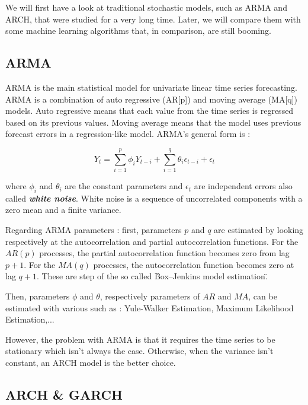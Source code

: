 \documentclass[11pt,a4paper,oneside]{book}
\begin{document}
We will first have a look at traditional stochastic models, such as ARMA and ARCH, that were studied for a very long time. Later, we will compare them with some machine learning algorithms that, in comparison, are still booming.


\subsection{ARMA}

ARMA is the main statistical model for univariate linear time series forecasting. ARMA is a combination of auto regressive (AR[p]) and moving average (MA[q]) models. Auto regressive means that each value from the time series is regressed based on its previous values. Moving average means that the model uses previous forecast errors in a regression-like model. ARMA's general form is : 

\begin{equation}
Y_{t} = \sum\limits_{i=1}^p \phi_{i} Y_{t-i} +  \sum\limits_{i=1}^q \theta_{i} \epsilon_{t-i} + \epsilon_{t} 
\end{equation}

where $\phi_{i}$ and $\theta_{i}$ are the constant parameters and $\epsilon_{t}$ are independent errors also called \textit{\textbf{white noise}}. White noise is a sequence of uncorrelated components with a zero mean and a finite variance.

Regarding ARMA parameters : first, parameters $p$ and $q$ are estimated by looking respectively at the autocorrelation and partial autocorrelation functions. For the $AR(p)$ processes, the partial autocorrelation function becomes zero from lag $p + 1$. For the $MA(q)$ processes, the autocorrelation function becomes zero at lag $q + 1$. These are step of the so called \"Box–Jenkins model estimation\". \cite{boxjenk}

Then, parameters $\phi$ and $\theta$, respectively parameters of $AR$ and $MA$, can be estimated with various such as : Yule-Walker Estimation, Maximum Likelihood Estimation,...

However, the problem with ARMA is that it requires the time series to be stationary which isn't always the case. Otherwise, when the variance isn't constant, an ARCH model is the better choice. \cite{Holan}


\subsection{ARCH \& GARCH}
\end{document}

